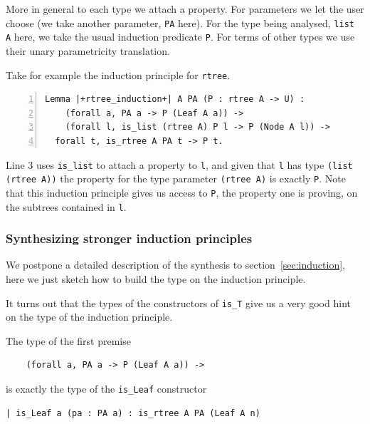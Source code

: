\documentclass[sigplan,10pt,review]{acmart}\settopmatter{printfolios=true,printccs=false,printacmref=false}
\begin{document}
More in general to each type we attach a property. For parameters we
let the user choose (we take another parameter, \lstinline+PA+ here).
For the type being analysed, \lstinline+list A+ here, we take the
usual induction predicate \lstinline+P+.
For terms of other types we use their unary parametricity translation.

Take for example the induction principle for \lstinline+rtree+.

\begin{minipage}{\textwidth}\begin{lstlisting}[numbers=left]
Lemma |+rtree_induction+| A PA (P : rtree A -> U) :
    (forall a, PA a -> P (Leaf A a)) ->
    (forall l, is_list (rtree A) P l -> P (Node A l)) ->
  forall t, is_rtree A PA t -> P t.
\end{lstlisting}\end{minipage}

\noindent
Line 3 uses \lstinline+is_list+ to attach a property to \lstinline+l+,
and given that \lstinline+l+ has type \lstinline+(list (rtree A))+
the property for the type parameter \lstinline+(rtree A)+ is
exactly \lstinline+P+.
Note that this induction principle gives us access to \lstinline+P+, the
property one is proving, on the subtrees contained in \lstinline+l+.

\subsubsection{Synthesizing stronger induction principles} %

We postpone a detailed description of the synthesis to
section~\ref{sec:induction}, here we just sketch how to
build the type on the induction principle.

It turns out that the types of the constructors of
\lstinline+is_T+ give us a very good hint on the type
of the induction principle.

The type of the first premise

\begin{minipage}{\textwidth}\begin{lstlisting}
    (forall a, PA a -> P (Leaf A a)) ->
\end{lstlisting}\end{minipage}

\noindent
is exactly the type of the \lstinline+is_Leaf+ constructor

\begin{minipage}{\textwidth}\begin{lstlisting}
| is_Leaf a (pa : PA a) : is_rtree A PA (Leaf A n)
\end{lstlisting}\end{minipage}
\end{document}

